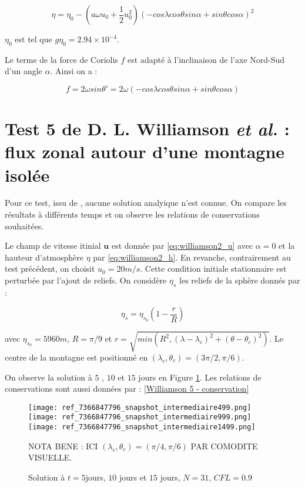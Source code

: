\begin{equation}
\eta = \eta_0 - \left( a \omega u_0 + \dfrac{1}{2}u_0^2 \right) \left( -cos \lambda cos \theta sin \alpha + sin \theta cos \alpha \right)^2
\label{eq:williamson2_h}
\end{equation}

$\eta_0$ est tel que $g \eta_0 = 2.94 \times 10^{-4}$. 

Le terme de la force de Coriolis $f$ est adapté à l'inclinaison de l'axe Nord-Sud d'un angle $\alpha$. Ainsi on a :

$$ f = 2 \omega sin \theta' = 2 \omega \left( -cos \lambda cos \theta sin \alpha + sin \theta cos \alpha \right)$$





\section{Test 5 de D. L. Williamson \textit{et al.} : flux zonal autour d'une montagne isolée}

Pour ce test, issu de \cite{Williamson1992}, aucune solution analyique n'est connue. On compare les résultats à différents temps et on observe les relations de conservations souhaitées.

Le champ de vitesse itinial $\mathbf{u}$ est donnée par \eqref{eq:williamson2_u} avec $\alpha=0$ et la hauteur d'atmosphère $\eta$ par \eqref{eq:williamson2_h}. En revanche, contrairement au test précédent, on choisit $u_0=20m/s$.
Cette condition initiale stationnaire est perturbée par l'ajout de reliefs. On considère $\eta_s$ les reliefs de la sphère donnés par :

\begin{equation}
\eta_s = \eta_{s_0} \left( 1 - \dfrac{r}{R} \right)
\end{equation}

avec $\eta_{s_0}=5960m$, $R=\pi/9$ et $r = \sqrt{min\left( R^2, \left( \lambda-\lambda_c \right)^2 + \left( \theta-\theta_c \right)^2 \right)}$.
Le centre de la montagne est positionné en $(\lambda_c, \theta_c) = (3\pi/2, \pi/6)$.

On observe la solution à $5$ , $10$ et $15$ jours en Figure \ref{Williamson 5 - visuel}. Les relations de conservations sont aussi données par : \ref{Williamson 5 - conservation}

\begin{figure}
\begin{center}
\texttt{[image: ref\_7366847796\_snapshot\_intermediaire499.png]}\\
\texttt{[image: ref\_7366847796\_snapshot\_intermediaire999.png]}\\
\texttt{[image: ref\_7366847796\_snapshot\_intermediaire1499.png]}
\end{center}
\caption{Solution à $t=5$jours, $10$ jours et $15$ jours, $N=31$, $CFL=0.9$}
\begin{com}
NOTA BENE : ICI $(\lambda_c, \theta_c)=(\pi/4, \pi/6)$ PAR COMODITE VISUELLE.
\end{com}
\label{Williamson 5 - visuel} 
\end{figure}

